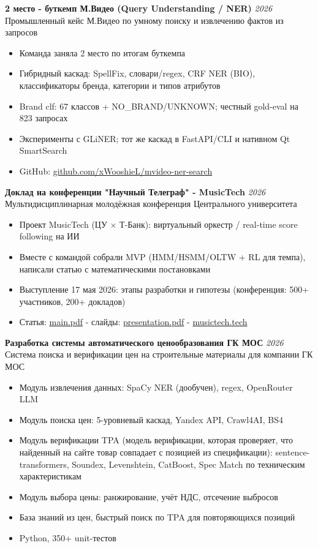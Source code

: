 \documentclass[11pt,a4paper]{article}
\newcommand{\hlblue}[1]{\textcolor{pastelblue}{#1}}
\newcommand{\hlgreen}[1]{\textcolor{pastelgreen}{#1}}
\newcommand{\achievement}[4]{
  \par\noindent
  \begin{minipage}{\textwidth}
  \textbf{\color{primarycolor}#1} \hfill {\color{secondarycolor}\textit{#2}}\\
  {\color{secondarycolor}#3}
  \vspace{2pt}

  #4
  \end{minipage}
  \vspace{4pt}
}
\begin{document}
\achievement
  {2 место  -  буткемп М.Видео (Query Understanding / NER)}
  {2026}
  {Промышленный кейс М.Видео по умному поиску и извлечению фактов из запросов}
  {
    \begin{itemize}
      \item Команда заняла \hlblue{2 место} по итогам буткемпа
      \item Гибридный каскад: SpellFix, словари/regex, CRF NER (BIO), классификаторы бренда, категории и типов атрибутов
      \item Brand clf: 67 классов + NO\_BRAND/UNKNOWN; честный gold-eval на 823 запросах
      \item Эксперименты с GLiNER; тот же каскад в FastAPI/CLI и нативном Qt SmartSearch
      \item GitHub: \href{https://github.com/xWooshieL/mvideo-ner-search}{github.com/xWooshieL/mvideo-ner-search}
    \end{itemize}
  }

\achievement
  {Доклад на конференции "Научный Телеграф"  -  MusicTech}
  {2026}
  {Мультидисциплинарная молодёжная конференция Центрального университета}
  {
    \begin{itemize}
      \item Проект \hlgreen{MusicTech} (ЦУ $\times$ Т-Банк): виртуальный оркестр / real-time score following на ИИ
      \item Вместе с командой собрали MVP (HMM/HSMM/OLTW + RL для темпа), написали статью с математическими постановками
      \item Выступление 17 мая 2026: этапы разработки и гипотезы (конференция: 500+ участников, 200+ докладов)
      \item Статья: \href{https://github.com/xWooshieL/music-tech/blob/master/article/main.pdf}{main.pdf}  - 
        слайды: \href{https://github.com/xWooshieL/music-tech/blob/master/article/presentation/presentation.pdf}{presentation.pdf}  - 
        \href{https://musictech.tech}{musictech.tech}
    \end{itemize}
  }

\achievement
  {Разработка системы автоматического ценообразования ГК МОС}
  {2026}
  {Система поиска и верификации цен на строительные материалы для компании ГК МОС}
  {
    \begin{itemize}
      \item Модуль извлечения данных: SpaCy NER (дообучен), regex, OpenRouter LLM
      \item Модуль поиска цен: 5-уровневый каскад, Yandex API, Crawl4AI, BS4
      \item Модуль верификации TPA (модель верификации, которая проверяет, что найденный на сайте товар совпадает с позицией из спецификации): sentence-transformers, Soundex, Levenshtein, CatBoost, Spec Match по техническим характеристикам
      \item Модуль выбора цены: ранжирование, учёт НДС, отсечение выбросов
      \item База знаний из цен, быстрый поиск по TPA для повторяющихся позиций
      \item Python, 350+ unit-тестов
    \end{itemize}
  }
\end{document}
